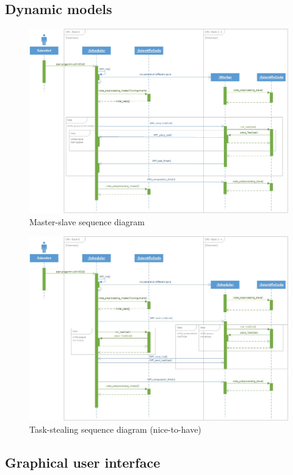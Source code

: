 \subsection{Dynamic models}
	\begin{figure}[H]
		\includegraphics[width=15cm]{images/Master-slave.jpg}
		\caption{Master-slave sequence diagram} 
		
	\end{figure}
	\begin{figure}[H]
		\includegraphics[width=15cm]{images/Task-stealing.jpg}
		\caption{Task-stealing sequence diagram (nice-to-have)}
	\end{figure}

\subsection{Graphical user interface}

